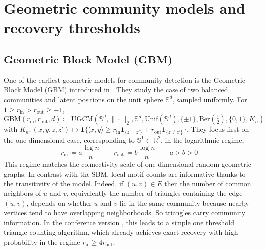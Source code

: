 \documentclass[runningheads]{llncs}
\begin{document}
\section{Geometric community models and recovery thresholds}\label{sec:models}

\subsection{Geometric Block Model (GBM)}

One of the earliest geometric models for community detection is the Geometric Block Model (GBM) introduced in \citep{galhotra2018geometric}. They study the case of two balanced communities and latent positions on the unit sphere \(\mathbb S^{d}\), sampled uniformly. For \(1 \geq r_{\mathrm{in}} > r_{\mathrm{out}} \geq -1\),
\[
\mathrm{GBM}(r_\mathrm{in}, r_\mathrm{out}, d) \coloneqq \mathrm{UGCM}(\mathbb S^{d},\|\cdot\|_2, \mathbb S^{d} ,  \mathrm{Unif}( \mathbb S^{d}),  \{\pm1\},  \text{Ber}(\tfrac12),  \{0,1\}, K_n)
\]
with \(K_n : (x,y,z,z') \mapsto \mathbf{1}\{\langle x, y \rangle \geq r_{\mathrm{in}}\mathbf 1_{\{z=z'\}}+
r_{\mathrm{out}}\mathbf 1_{\{z\neq z'\}}\} \).
They focus first on the one dimensional case, corresponding to \(\mathbb S^1 \subset \mathbb R^2\), in the logarithmic regime,
\[
r_\mathrm{in} \coloneqq a\frac{\log n}{n} \qquad r_\mathrm{out} \coloneqq b\frac{\log n}{n} \qquad a>b>0
\]
This regime matches the connectivity scale of one dimensional random geometric graphs. In contrast with the SBM, local motif counts are informative thanks to the transitivity of the model. Indeed, if \((u,v)\in E\) then the number of common neighbors of \(u\) and \(v\), equivalently the number of triangles containing the edge \((u,v)\), depends on whether \(u\) and \(v\) lie in the same community because nearby vertices tend to have overlapping neighborhoods. So triangles carry community information. In the conference version \citep{galhotra2018geometric}, this leads to a simple one threshold triangle counting algorithm, which already achieves exact recovery with high probability in the regime \(r_\mathrm{in}\ge 4r_\mathrm{out}\).
\end{document}
